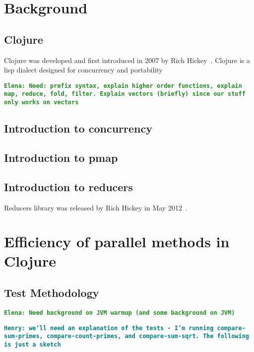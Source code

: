 \documentclass[12pt]{article}
\newcommand{\comment}[1]{{\bf \tt  {#1}}}
\newcommand{\emcomment}[1]{\textcolor{ForestGreen}{\comment{Elena: {#1}}}}
\newcommand{\hfcomment}[1]{\textcolor{Teal}{\comment{Henry: {#1}}}}
\begin{document}
\section{Background}\label{sec:background}




\subsection{Clojure}\label{sec:clojure}
Clojure was developed and first introduced in 2007 by Rich Hickey~\cite{Hickey:2008}. Clojure is a lisp dialect designed for concurrency and portability

\emcomment{Need: prefix syntax, explain higher order functions, explain map, reduce, fold, filter. Explain vectors (briefly) since our stuff only works on vectors}


\subsection{Introduction to concurrency}\label{sec:concurrency}




\subsection{Introduction to pmap}\label{sec:pmap}




\subsection{Introduction to reducers}\label{sec:reducers}
Reducers library was released by Rich Hickey in May 2012~\cite{HickeyReducers}. 

\section{Efficiency of parallel methods in Clojure}\label{sec:efficiency}

\subsection{Test Methodology}\label{sec:methods}
 
\emcomment{Need background on JVM warmup (and some background on JVM)}
 
\hfcomment{we'll need an explanation of the tests - I'm running compare-sum-primes, compare-count-primes, and compare-sum-sqrt. The following is just a sketch}
\end{document}
